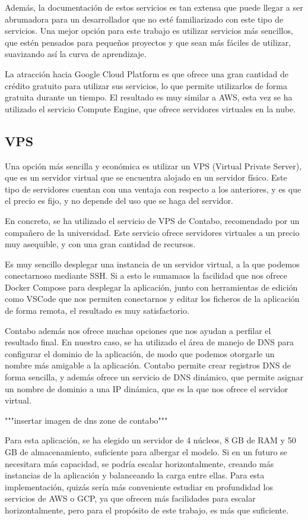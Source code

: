 Además, la documentación de estos servicios es tan extensa que puede llegar a ser abrumadora para un desarrollador que no esté familiarizado con este tipo de servicios.
Una mejor opción para este trabajo es utilizar servicios más sencillos, que estén pensados para pequeños proyectos y que sean más fáciles de utilizar, suavizando así la curva de aprendizaje.

La atracción hacia Google Cloud Platform es que ofrece una gran cantidad de crédito gratuito para utilizar sus servicios, lo que permite utilizarlos de forma gratuita durante un tiempo.
El resultado es muy similar a AWS, esta vez se ha utilizado el servicio Compute Engine, que ofrece servidores virtuales en la nube.


\subsection{VPS}
Una opción más sencilla y económica es utilizar un VPS (Virtual Private Server), que es un servidor virtual que se encuentra alojado en un servidor físico.
Este tipo de servidores cuentan con una ventaja con respecto a los anteriores, y es que el precio es fijo, y no depende del uso que se haga del servidor.

En concreto, se ha utilizado el servicio de VPS de Contabo, recomendado por un compañero de la universidad.
Este servicio ofrece servidores virtuales a un precio muy asequible, y con una gran cantidad de recursos.

Es muy sencillo desplegar una instancia de un servidor virtual, a la que podemos conectarnoso mediante SSH.
Si a esto le sumamaos la facilidad que nos ofrece Docker Compose para desplegar la aplicación, junto con herramientas de edición como VSCode que nos permiten conectarnos y 
editar los ficheros de la aplicación de forma remota, el resultado es muy satisfactorio.

Contabo además nos ofrece muchas opciones que nos ayudan a perfilar el resultado final.
En nuestro caso, se ha utilizado el área de manejo de DNS para configurar el dominio de la aplicación, de modo que podemos otorgarle un nombre más amigable a la aplicación.
Contabo permite crear registros DNS de forma sencilla, y además ofrece un servicio de DNS dinámico, que permite asignar un nombre de dominio a una IP dinámica, que es la que nos ofrece el servidor virtual.

"""insertar imagen de dns zone de contabo"""

Para esta aplicación, se ha elegido un servidor de 4 núcleos, 8 GB de RAM y 50 GB de almacenamiento, suficiente para albergar el modelo.
Si en un futuro se necesitara más capacidad, se podría escalar horizontalmente, creando más instancias de la aplicación y balanceando la carga entre ellas.
Para esta implementación, quizás sería más conveniente estudiar en profundidad los servicios de AWS o GCP, ya que ofrecen más facilidades para escalar horizontalmente, pero para el propósito de este trabajo, es más que suficiente.





\endinput